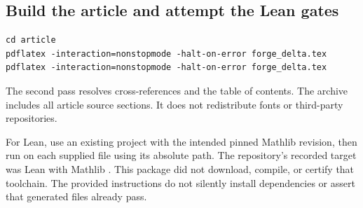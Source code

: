 \subsection{Build the article and attempt the Lean gates}
\begin{lstlisting}
cd article
pdflatex -interaction=nonstopmode -halt-on-error forge_delta.tex
pdflatex -interaction=nonstopmode -halt-on-error forge_delta.tex
\end{lstlisting}
The second pass resolves cross-references and the table of contents. The
archive includes all article source sections. It does not redistribute fonts
or third-party repositories.

For Lean, use an existing project with the intended pinned Mathlib revision,
then run  on each supplied file using its absolute path.
The repository's recorded target was Lean  with Mathlib
. This package did not download,
compile, or certify that toolchain. The provided instructions do not silently
install dependencies or assert that generated files already pass.
